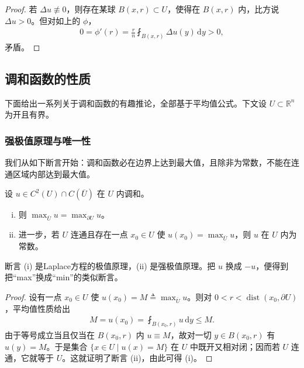 \documentclass[../../main.tex]{subfiles}
\begin{document}
\begin{proof}
若 $\Delta u\not\equiv 0$，则存在某球 $B(x,r)\subset U$，使得在 $B(x,r)$ 内，比方说 $\Delta u>0$。但对如上的 $\phi$，
\begin{align*}
0=\phi'(r)=\frac{r}{n}\fint_{B(x,r)}\Delta u(y)\,\mathrm{d}y>0,
\end{align*}
矛盾。
\end{proof}

\subsection{调和函数的性质}\label{subsection:ch02-properties}

下面给出一系列关于调和函数的有趣推论，全部基于平均值公式。下文设 $U\subset\mathbb{R}^n$ 为开且有界。

\subsubsection{强极值原理与唯一性}

我们从如下断言开始：调和函数必在边界上达到最大值，且除非为常数，不能在连通区域内部达到最大值。

\begin{theorem}[强极值原理]\label{theorem:ch02-strong-max}设 $u\in C^2(U)\cap C(\overline{U})$ 在 $U$ 内调和。
\begin{enumerate}[(i)]
\item 则 $\max_{\overline{U}}u=\max_{\partial U}u$。
\item 进一步，若 $U$ 连通且存在一点 $x_0\in U$ 使 $u(x_0)=\max_{\overline{U}}u$，则 $u$ 在 $U$ 内为常数。
\end{enumerate}
\end{theorem}

断言 (i) 是Laplace方程的极值原理，(ii) 是强极值原理。把 $u$ 换成 $-u$，便得到把``max''换成``min''的类似断言。

\begin{proof}
设有一点 $x_0\in U$ 使 $u(x_0)=M\triangleq\max_{\overline{U}}u$。则对 $0<r<\operatorname{dist}(x_0,\partial U)$，平均值性质给出
\begin{align*}
M=u(x_0)=\fint_{B(x_0,r)}u\,\mathrm{d}y\leqslant M.
\end{align*}
由于等号成立当且仅当在 $B(x_0,r)$ 内 $u\equiv M$，故对一切 $y\in B(x_0,r)$ 有 $u(y)=M$。于是集合 $\{x\in U\mid u(x)=M\}$ 在 $U$ 中既开又相对闭；因而若 $U$ 连通，它就等于 $U$。这就证明了断言 (ii)，由此可得 (i)。
\end{proof}
\end{document}
